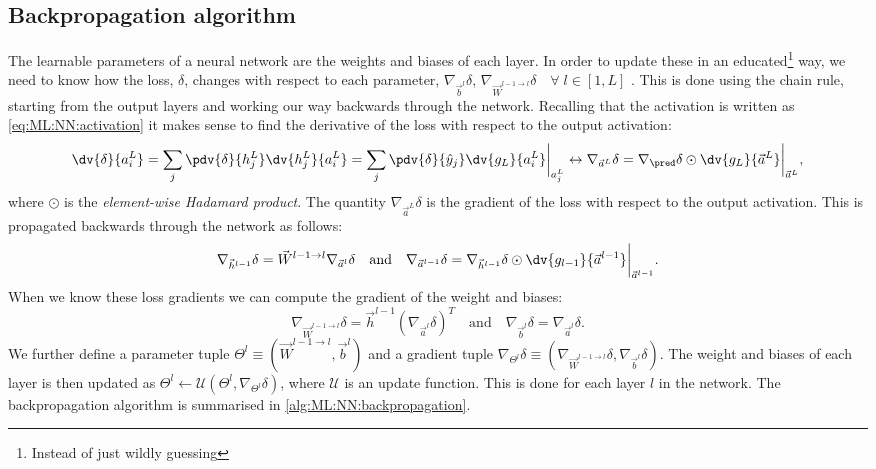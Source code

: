     \subsection{Backpropagation algorithm}
        The learnable parameters of a neural network are the weights and biases of each layer. In order to update these in an educated\footnote{Instead of just wildly guessing} way, we need to know how the loss, $\delta$, changes with respect to each parameter, $\nabla_{\vec{b}^l}\delta$, $\nabla_{\vec{W}^{l-1\to l}}\delta \quad \forall \; l \in [1,L]$ . This is done using the chain rule, starting from the output layers and working our way backwards through the network. Recalling that the activation is written as \cref{eq:ML:NN:activation} it makes sense to find the derivative of the loss with respect to the output activation:
        \begin{equation}
            \dv{\delta}{a^L_i} = \sum_j\pdv{\delta}{h^L_j}\dv{h^L_j}{a^L_i} = \sum_j\pdv{\delta}{\hat{y}_j}\dv{g_L}{a^L_i}\bigg|_{a^L_j} \leftrightarrow \nabla_{\vec{a}^L}\delta = \nabla_{\pred}\delta \odot \dv{g_L}{\vec{a}^L}\bigg|_{\vec{a}^L},
        \end{equation}
        where $\odot$ is the \textit{element-wise Hadamard product}. The quantity $\nabla_{\vec{a}^L}\delta$ is the gradient of the loss with respect to the output activation. This is propagated backwards through the network as follows:
        \begin{equation}
            \nabla_{\vec{h}^{l-1}}\delta = \vec{W}^{l-1\to l}\nabla_{\vec{a}^l}\delta \quad \mathrm{and} \quad \nabla_{\vec{a}^{l-1}}\delta = \nabla_{\vec{h}^{l-1}}\delta \odot \dv{g_{l-1}}{\vec{a}^{l-1}}\bigg|_{\vec{a}^{l-1}}.
        \end{equation}
        When we know these loss gradients we can compute the gradient of the weight and biases:
        \begin{equation}
            \nabla_{\vec{W}^{l-1\to l}}\delta = \vec{h}^{l-1}(\nabla_{\vec{a}^l}\delta)^T \quad \mathrm{and} \quad \nabla_{\vec{b}^l}\delta = \nabla_{\vec{a}^l}\delta.
        \end{equation}
        We further define a parameter tuple $\Theta^l \equiv (\vec{W}^{l-1\to l}, \vec{b}^l)$ and a gradient tuple $\nabla_{\Theta^l}\delta \equiv (\nabla_{\vec{W}^{l-1\to l}}\delta, \nabla_{\vec{b}^l}\delta)$. The weight and biases of each layer is then updated as $\Theta^l \leftarrow \mathcal{U}(\Theta^l, \nabla_{\Theta^l}\delta)$, where $\mathcal{U}$ is an update function. This is done for each layer $l$ in the network. The backpropagation algorithm is summarised in \cref{alg:ML:NN:backpropagation}.
